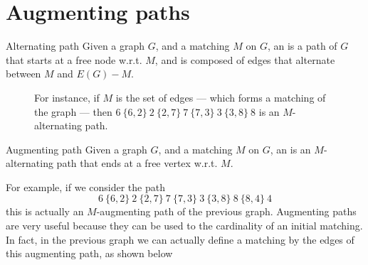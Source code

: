 \documentclass[a4paper, 12pt]{report}
\begin{document}
    \section{Augmenting paths}

    \begin{frameddefn}{Alternating path}
        Given a graph $G$, and a matching $M$ on $G$, an  is a path of $G$ that starts at a free node w.r.t. $M$, and is composed of edges that alternate between $M$ and $E(G) - M$.
    \end{frameddefn}

    \begin{figure}[H]
        \centering
        \caption{For instance, if $M$ is the set of  edges --- which forms a matching of the graph --- then $6 \ \{6, 2\} \ 2 \ \{2, 7\} \ 7 \ \{7, 3\} \ 3 \ \{3, 8\} \ 8$ is an $M$-alternating path.}
    \end{figure}
    
    \begin{frameddefn}{Augmenting path}
        Given a graph $G$, and a matching $M$ on $G$, an  is an $M$-alternating path that ends at a free vertex w.r.t. $M$.
    \end{frameddefn}

    For example, if we consider the path $$6 \ \{6, 2\} \ 2 \ \{2, 7\} \ 7 \ \{7, 3\} \ 3 \ \{3, 8\} \ 8 \ \{8, 4 \} \ 4$$ this is actually an $M$-augmenting path of the previous graph. Augmenting paths are very useful because they can be used to  the cardinality of an initial matching. In fact, in the previous graph we can actually define a  matching by  the edges of this augmenting path, as shown below
\end{document}
